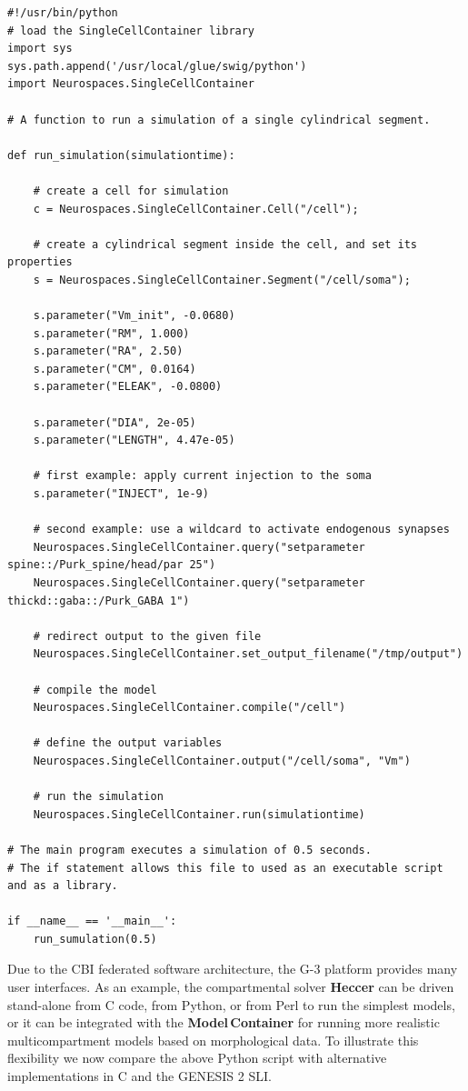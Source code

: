 \documentclass[12pt]{article}
\begin{document}
{\vspace*{1mm}
 { \footnotesize
  \linenumbers
  {\begin{verbatim}
#!/usr/bin/python
# load the SingleCellContainer library
import sys
sys.path.append('/usr/local/glue/swig/python')
import Neurospaces.SingleCellContainer

# A function to run a simulation of a single cylindrical segment.

def run_simulation(simulationtime):
   
    # create a cell for simulation
    c = Neurospaces.SingleCellContainer.Cell("/cell");

    # create a cylindrical segment inside the cell, and set its properties
    s = Neurospaces.SingleCellContainer.Segment("/cell/soma");

    s.parameter("Vm_init", -0.0680)
    s.parameter("RM", 1.000)
    s.parameter("RA", 2.50)
    s.parameter("CM", 0.0164)
    s.parameter("ELEAK", -0.0800)

    s.parameter("DIA", 2e-05)
    s.parameter("LENGTH", 4.47e-05)

    # first example: apply current injection to the soma
    s.parameter("INJECT", 1e-9)

    # second example: use a wildcard to activate endogenous synapses
    Neurospaces.SingleCellContainer.query("setparameter spine::/Purk_spine/head/par 25")
    Neurospaces.SingleCellContainer.query("setparameter thickd::gaba::/Purk_GABA 1")
    
    # redirect output to the given file
    Neurospaces.SingleCellContainer.set_output_filename("/tmp/output")
    
    # compile the model
    Neurospaces.SingleCellContainer.compile("/cell")
    
    # define the output variables
    Neurospaces.SingleCellContainer.output("/cell/soma", "Vm")
    
    # run the simulation
    Neurospaces.SingleCellContainer.run(simulationtime)

# The main program executes a simulation of 0.5 seconds.
# The if statement allows this file to used as an executable script and as a library.

if __name__ == '__main__':
    run_sumulation(0.5) 
\end{verbatim}
  \vspace*{1mm} }}}

Due to the CBI federated software architecture, the G-3 platform provides many user
interfaces.  As an example, the compartmental solver {\bf Heccer} can be driven
stand-alone from C code, from Python, or from Perl to run the simplest
models, or it can be integrated with the {\bf Model\,Container} for
running more realistic multicompartment models based on morphological
data.  To illustrate this flexibility we now compare the above Python
script with alternative implementations in C and the GENESIS 2 SLI.
\end{document}
